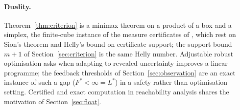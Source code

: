\documentclass[11pt,a4paper]{article}
\theoremstyle{plain}
\theoremstyle{definition}
\theoremstyle{remark}
\newcommand{\Lstar}{L^{\ast}}
\newcommand{\Fstar}{F^{\ast}}
\begin{document}
\paragraph{Duality.}
Theorem~\ref{thm:criterion} is a minimax theorem on a product of a box and a simplex, the finite-cube instance of the measure certificates of \cite{Abaee2026minimax}, which rest on Sion's theorem and Helly's bound on certificate support; the support bound $m+1$ of Section~\ref{sec:criterion} is the same Helly number. Adjustable robust optimisation \cite{WeiZhang2024} asks when adapting to revealed uncertainty improves a linear programme; the feedback thresholds of Section~\ref{sec:observation} are an exact instance of such a gap ($\Fstar<\infty=\Lstar$) in a safety rather than optimisation setting. Certified and exact computation in reachability analysis \cite{Althoff2020,Geretti2020} shares the motivation of Section~\ref{sec:float}.
\end{document}
